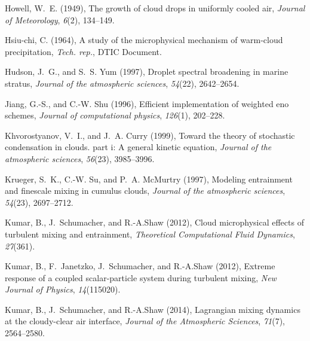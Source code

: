 \documentclass[draft,linenumbers]{AGUJournal}
\begin{document}
\begin{thebibliography}{60}
Howell, W.~E. (1949), The growth of cloud drops in uniformly cooled air,
  \textit{Journal of Meteorology}, \textit{6}(2), 134--149.

Hsiu-chi, C. (1964), A study of the microphysical mechanism of warm-cloud
  precipitation, \textit{Tech. rep.}, DTIC Document.

Hudson, J.~G., and S.~S. Yum (1997), Droplet spectral broadening in marine
  stratus, \textit{Journal of the atmospheric sciences}, \textit{54}(22),
  2642--2654.

Jiang, G.-S., and C.-W. Shu (1996), Efficient implementation of weighted eno
  schemes, \textit{Journal of computational physics}, \textit{126}(1),
  202--228.

Khvorostyanov, V.~I., and J.~A. Curry (1999), Toward the theory of stochastic
  condensation in clouds. part i: A general kinetic equation, \textit{Journal
  of the atmospheric sciences}, \textit{56}(23), 3985--3996.

Krueger, S.~K., C.-W. Su, and P.~A. McMurtry (1997), Modeling entrainment and
  finescale mixing in cumulus clouds, \textit{Journal of the atmospheric
  sciences}, \textit{54}(23), 2697--2712.

Kumar, B., J.~Schumacher, and R.-A.Shaw (2012{}), Cloud
  microphysical effects of turbulent mixing and entrainment,
  \textit{Theoretical Computational Fluid Dynamics}, \textit{27}(361).

Kumar, B., F.~Janetzko, J.~Schumacher, and R.-A.Shaw (2012{}),
  Extreme response of a coupled scalar-particle system during turbulent mixing,
  \textit{New Journal of Physics}, \textit{14}(115020).

Kumar, B., J.~Schumacher, and R.-A.Shaw (2014), Lagrangian mixing dynamics at
  the cloudy-clear air interface, \textit{Journal of the Atmospheric Sciences},
  \textit{71}(7), 2564--2580.


\end{thebibliography}
\end{document}
